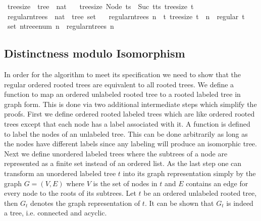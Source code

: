 \begin{isabellebox}
    \isamarkupfalse%
    \ tree{\isacharunderscore}{\kern0pt}size\ {\isacharcolon}{\kern0pt}{\isacharcolon}{\kern0pt}\ {\isachardoublequoteopen}tree\ {\isasymRightarrow}\ nat{\isachardoublequoteclose}\ \isanewline
    \ \ {\isachardoublequoteopen}tree{\isacharunderscore}{\kern0pt}size\ {\isacharparenleft}{\kern0pt}Node\ ts{\isacharparenright}{\kern0pt}\ {\isacharequal}{\kern0pt}\ Suc\ {\isacharparenleft}{\kern0pt}{\isasymSum}t{\isasymleftarrow}ts{\isachardot}{\kern0pt}\ tree{\isacharunderscore}{\kern0pt}size\ t{\isacharparenright}{\kern0pt}{\isachardoublequoteclose}\isanewline
    \isanewline
    \isamarkupfalse%
    \ regular{\isacharunderscore}{\kern0pt}n{\isacharunderscore}{\kern0pt}trees\ {\isacharcolon}{\kern0pt}{\isacharcolon}{\kern0pt}\ {\isachardoublequoteopen}nat\ {\isasymRightarrow}\ tree\ set{\isachardoublequoteclose}\ \isanewline
    \ \ {\isachardoublequoteopen}regular{\isacharunderscore}{\kern0pt}n{\isacharunderscore}{\kern0pt}trees\ n\ {\isacharequal}{\kern0pt}\ {\isacharbraceleft}{\kern0pt}t{\isachardot}{\kern0pt}\ tree{\isacharunderscore}{\kern0pt}size\ t\ {\isacharequal}{\kern0pt}\ n\ {\isasymand}\ regular\ t{\isacharbraceright}{\kern0pt}{\isachardoublequoteclose}%
    \isanewline\isanewline
    \isamarkupfalse%
    \ {\isachardoublequoteopen}set\ {\isacharparenleft}{\kern0pt}n{\isacharunderscore}{\kern0pt}tree{\isacharunderscore}{\kern0pt}enum\ n{\isacharparenright}{\kern0pt}\ {\isacharequal}{\kern0pt}\ regular{\isacharunderscore}{\kern0pt}n{\isacharunderscore}{\kern0pt}trees\ n{\isachardoublequoteclose}
\end{isabellebox}

\subsection{Distinctness modulo Isomorphism}

In order for the algorithm to meet its specification we need to show that the regular ordered rooted trees are equivalent to all rooted trees.
We define a function to map an ordered unlabeled rooted tree to a rooted labeled tree in graph form.
This is done via two additional intermediate steps which simplify the proofs.
First we define ordered rooted labeled trees which are like ordered rooted trees except that each node has a label associated with it.
A function is defined to label the nodes of an unlabeled tree.
This can be done arbitrarily as long as the nodes have different labels since any labeling will produce an isomorphic tree.
Next we define unordered labeled trees where the subtrees of a node are represented as a finite set instead of an ordered list.
As the last step one can transform an unordered labeled tree $t$ into its graph representation simply by the graph $G = (V,E)$ where $V$ is the set of nodes in $t$ and $E$ contains an edge for every node to the roots of its subtrees.
Let $t$ be an ordered unlabeled rooted tree, then $G_t$ denotes the graph representation of $t$.
It can be shown that $G_t$ is indeed a tree, i.e. connected and acyclic.

